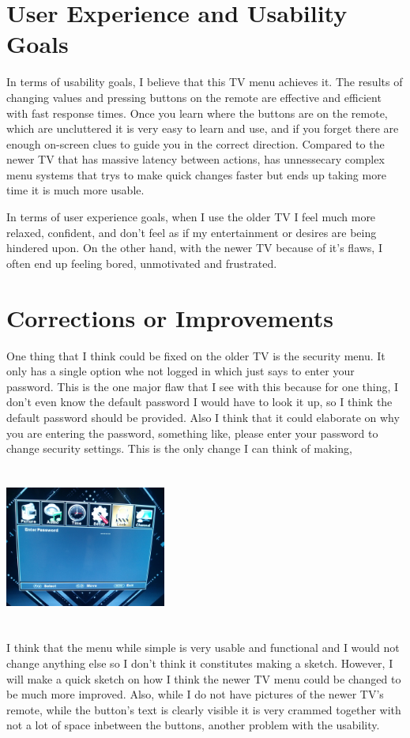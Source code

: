 \documentclass[a4paper, 11pt]{article}
\begin{document}
\section*{User Experience and Usability Goals}
In terms of usability goals, I believe that this TV menu achieves it.  The results of changing values and pressing buttons on the remote are effective and efficient with fast response times.  Once you learn where the buttons are on the remote, which are uncluttered it is very easy to learn and use, and if you forget there are enough on-screen clues to guide you in the correct direction.  Compared to the newer TV that has massive latency between actions, has unnessecary complex menu systems that trys to make quick changes faster but ends up taking more time it is much more usable.

In terms of user experience goals, when I use the older TV I feel much more relaxed, confident, and don't feel as if my entertainment or desires are being hindered upon.  On the other hand, with the newer TV because of it's flaws, I often end up feeling bored, unmotivated and frustrated.

\section*{Corrections or Improvements}
One thing that I think could be fixed on the older TV is the security menu.  It only has a single option whe not logged in which just says to enter your password.  This is the one major flaw that I see with this because for one thing, I don't even know the default password I would have to look it up, so I think the default password should be provided.  Also I think that it could elaborate on why you are entering the password, something like, please enter your password to change security settings.  This is the only change I can think of making, 

\includegraphics[width=200px,height=200px]{complaintold.jpg}

I think that the menu while simple is very usable and functional and I would not change anything else so I don't think it constitutes making a sketch.  However, I will make a quick sketch on how I think the newer TV menu could be changed to be much more improved.  Also, while I do not have pictures of the newer TV's remote, while the button's text is clearly visible it is very crammed together with not a lot of space inbetween the buttons, another problem with the usability.
\end{document}
